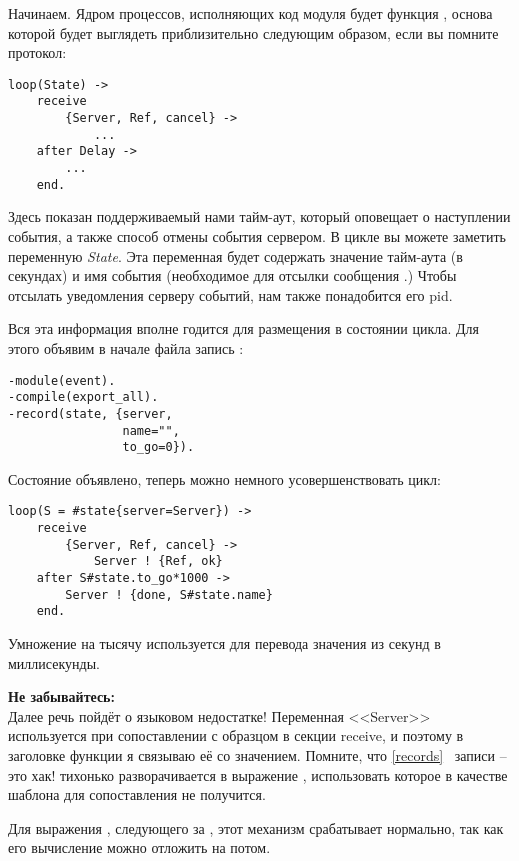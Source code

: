 Начинаем.
Ядром процессов, исполняющих код модуля  будет функция , основа которой будет выглядеть приблизительно следующим образом, если вы помните протокол:
\begin{lstlisting}[style=erlang]
loop(State) ->
    receive
        {Server, Ref, cancel} ->
            ...
    after Delay ->
        ...
    end.
\end{lstlisting}

Здесь показан поддерживаемый нами тайм\--аут, который оповещает о наступлении события, а также способ отмены события сервером.
В цикле вы можете заметить переменную \emph{State}.
Эта переменная будет содержать значение тайм\--аута (в секундах) и имя события (необходимое для отсылки сообщения .)
Чтобы отсылать уведомления серверу событий, нам также понадобится его pid.

Вся эта информация вполне годится для размещения в состоянии цикла.
Для этого объявим в начале файла запись :
\begin{lstlisting}[style=erlang]
-module(event).
-compile(export_all).
-record(state, {server,
                name="",
                to_go=0}).
\end{lstlisting}

Состояние объявлено, теперь можно немного усовершенствовать цикл:
\begin{lstlisting}[style=erlang]
loop(S = #state{server=Server}) ->
    receive
        {Server, Ref, cancel} ->
            Server ! {Ref, ok}
    after S#state.to_go*1000 ->
        Server ! {done, S#state.name}
    end.
\end{lstlisting}

Умножение на тысячу используется для перевода значения  из секунд в миллисекунды.\\
\colorbox{lorange}
{
\begin{minipage}{1.0\linewidth}
    \textbf{Не забывайтесь:}\\
    Далее речь пойдёт о языковом недостатке!
    Переменная <<Server>> используется при сопоставлении с образцом в секции receive, и поэтому в заголовке функции я связываю её со значением.
    Помните, что \ref{records} ~записи \--- это хак!
     тихонько разворачивается в выражение , использовать которое в качестве шаблона для сопоставления не получится.

    Для выражения , следующего за , этот механизм срабатывает нормально, так как его вычисление можно отложить на потом.
\end{minipage}
}

